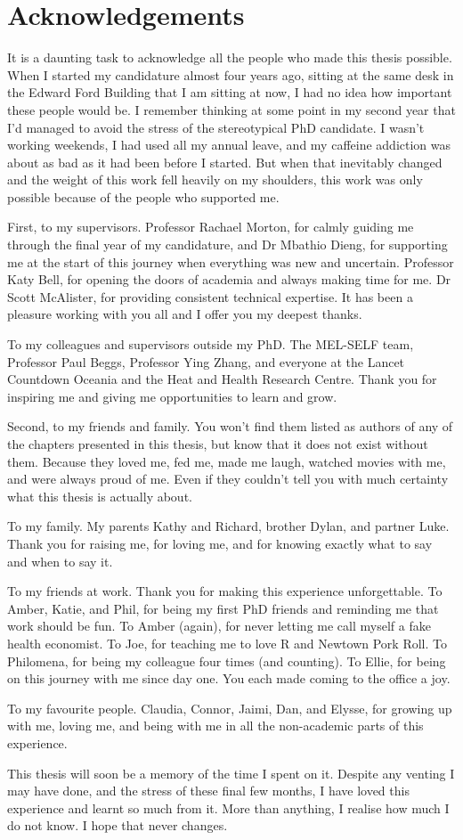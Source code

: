 \chapter{Acknowledgements}

It is a daunting task to acknowledge all the people who made this thesis possible. When I started my candidature almost four years ago, sitting at the same desk in the Edward Ford Building that I am sitting at now, I had no idea how important these people would be. I remember thinking at some point in my second year that I'd managed to avoid the stress of the stereotypical PhD candidate. I wasn't working weekends, I had used all my annual leave, and my caffeine addiction was about as bad as it had been before I started. But when that inevitably changed and the weight of this work fell heavily on my shoulders, this work was only possible because of the people who supported me.

First, to my supervisors. Professor Rachael Morton, for calmly guiding me through the final year of my candidature, and Dr Mbathio Dieng, for supporting me at the start of this journey when everything was new and uncertain. Professor Katy Bell, for opening the doors of academia and always making time for me. Dr Scott McAlister, for providing consistent technical expertise. It has been a pleasure working with you all and I offer you my deepest thanks.

To my colleagues and supervisors outside my PhD. The MEL-SELF team, Professor Paul Beggs, Professor Ying Zhang, and everyone at the Lancet Countdown Oceania and the Heat and Health Research Centre. Thank you for inspiring me and giving me opportunities to learn and grow.

Second, to my friends and family. You won’t find them listed as authors of any of the chapters presented in this thesis, but know that it does not exist without them. Because they loved me, fed me, made me laugh, watched movies with me, and were always proud of me. Even if they couldn't tell you with much certainty what this thesis is actually about. 

To my family. My parents Kathy and Richard, brother Dylan, and partner Luke. Thank you for raising me, for loving me, and for knowing exactly what to say and when to say it.

To my friends at work. Thank you for making this experience unforgettable. To Amber, Katie, and Phil, for being my first PhD friends and reminding me that work should be fun. To Amber (again), for never letting me call myself a fake health economist. To Joe, for teaching me to love R and Newtown Pork Roll. To Philomena, for being my colleague four times (and counting). To Ellie, for being on this journey with me since day one. You each made coming to the office a joy.

To my favourite people. Claudia, Connor, Jaimi, Dan, and Elysse, for growing up with me, loving me, and being with me in all the non-academic parts of this experience. 

This thesis will soon be a memory of the time I spent on it. Despite any venting I may have done, and the stress of these final few months, I have loved this experience and learnt so much from it. More than anything, I realise how much I do not know. I hope that never changes.